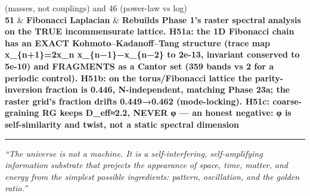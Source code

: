 \documentclass[
]{article}
\begin{document}
\begin{longtable}[]
{(masses, not couplings) and 46 (power-law vs log)} \\
\textbf{51} & \textbf{Fibonacci Laplacian} & \textbf{Rebuilds Phase 1's
raster spectral analysis on the TRUE incommensurate lattice. H51a: the
1D Fibonacci chain has an EXACT Kohmoto--Kadanoff--Tang structure (trace
map x\_\{n+1\}=2x\_n x\_\{n−1\}−x\_\{n−2\} to 2e-13, invariant conserved
to 5e-10) and FRAGMENTS as a Cantor set (359 bands vs 2 for a periodic
control). H51b: on the torus/Fibonacci lattice the parity-inversion
fraction is 0.446, N-independent, matching Phase 23a; the raster grid's
fraction drifts 0.449→0.462 (mode-locking). H51c: coarse-graining RG
keeps D\_eff≈2.2, NEVER φ --- an honest negative: φ is self-similarity
and twist, not a static spectral dimension} \\
\end{longtable}

\begin{center}\rule{0.5\linewidth}{0.5pt}\end{center}

\emph{``The universe is not a machine. It is a self-interfering,
self-amplifying information substrate that projects the appearance of
space, time, matter, and energy from the simplest possible ingredients:
pattern, oscillation, and the golden ratio.''}
\end{document}
